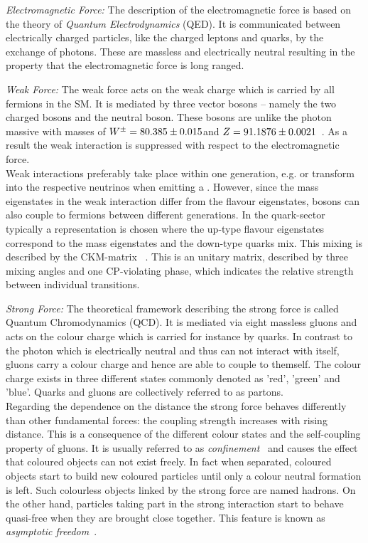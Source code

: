 \begin{description}
\begin{description}
  \item \textit{Electromagnetic Force:} The description of the electromagnetic force is based on the theory of \textit{Quantum Electrodynamics} (QED). It is communicated between electrically charged particles, like the charged leptons and quarks, by the exchange of photons. These are massless and electrically neutral resulting in the property that the electromagnetic force is long ranged.
  \item \textit{Weak Force:} The weak force acts on the weak charge which is carried by all fermions in the SM. It is mediated by three vector bosons -- namely the two charged \Wpm bosons and the neutral \Z boson. These bosons are unlike the photon massive with masses of $W^{\pm} = 80.385 \pm 0.015$\gev and $Z = 91.1876 \pm 0.0021$\gev~\cite{bib:PDG:2012}. As a result the weak interaction is suppressed with respect to the electromagnetic force. \\
Weak interactions preferably take place within one generation, e.g. \lel or \lmu transform into the respective neutrinos when emitting a \Wm. However, since the mass eigenstates in the weak interaction differ from the flavour eigenstates, \Wpm bosons can also couple to fermions between different generations. In the quark-sector typically a representation is chosen where the up-type flavour eigenstates correspond to the mass eigenstates and the down-type quarks mix. This mixing is described by the CKM-matrix ~\cite{PhysRevLett.10.531, PTP.49.652}. This is an unitary matrix, described by three mixing angles and one CP-violating phase, which indicates the relative strength between individual transitions. 
  \item \textit{Strong Force:} The theoretical framework describing the strong force is called Quantum Chromodynamics (QCD). It is mediated via eight massless gluons and acts on the colour charge which is carried for instance by quarks. In contrast to the photon which is electrically neutral and thus can not interact with itself, gluons carry a colour charge and hence are able to couple to themself. The colour charge exists in three different states commonly denoted as 'red', 'green' and 'blue'. Quarks and gluons are collectively referred to as partons. \\
Regarding the dependence on the distance the strong force behaves differently than other fundamental forces: the coupling strength increases with rising distance. This is a consequence of the different colour states and the self-coupling property of gluons. It is usually referred to as \textit{confinement}~\cite{Alkofer:2006fu} and causes the effect that coloured objects can not exist freely. In fact when separated, coloured objects start to build new coloured particles until only a colour neutral formation is left. Such colourless objects linked by the strong force are named hadrons. On the other hand, particles taking part in the strong interaction start to behave quasi-free when they are brought close together. This feature is known as \textit{asymptotic freedom}~\cite{PhysRevLett.30.1346, PhysRevLett.30.1343}. 

\end{description}
\end{description}
